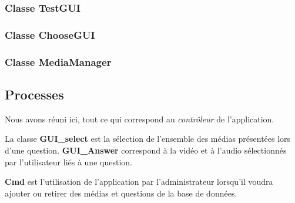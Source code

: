 \subsubsection{Classe TestGUI}

\subsubsection{Classe ChooseGUI}

\subsubsection{Classe MediaManager}

\subsection{Processes}

Nous avons réuni ici, tout ce qui correspond au \textit{contrôleur} de l'application.

La classe \textbf{GUI\_select} est la sélection de l'ensemble des médias présentées lors d'une question.
\textbf{GUI\_Answer} correspond à la vidéo et à l'audio sélectionnés par l'utilisateur liés à une question.

\textbf{Cmd} est l'utilisation de l'application par l'administrateur lorsqu'il voudra ajouter ou retirer des médias et questions de la base de données.